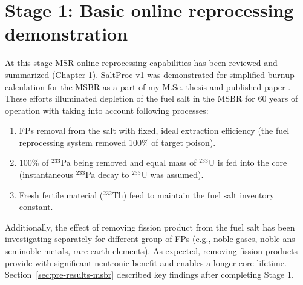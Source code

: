 \section{Stage 1: Basic online reprocessing demonstration}
At this stage \gls{MSR} online reprocessing capabilities has been reviewed and 
summarized (Chapter 1). SaltProc v1 was demonstrated for simplified burnup 
calculation for the \gls{MSBR} as a part of my M.Sc. thesis 
\cite{rykhlevskii_advanced_2018} and published paper 
\cite{rykhlevskii_modeling_2019}. These efforts illuminated depletion of the 
fuel salt in the \gls{MSBR} for 60 years of operation with taking into account 
following processes:
\begin{enumerate}
	\item \glspl{FP} removal from the salt with fixed, ideal extraction 
	efficiency (the fuel reprocessing system removed 100\% of target poison).
	\item 100\% of $^{233}$Pa being removed and equal mass of $^{233}$U is fed 
	into the core (instantaneous $^{233}$Pa decay to $^{233}$U was assumed).
	\item Fresh fertile material ($^{232}$Th) feed to maintain the fuel salt 
	inventory constant.
\end{enumerate}
Additionally, the effect of removing fission product from the fuel salt has 
been investigating separately for different group of \glspl{FP} (e.g., noble 
gases, noble ans seminoble metals, rare earth elements). As expected, removing 
fission products provide with significant neutronic benefit and enables a 
longer core lifetime. Section~\ref{sec:pre-results-msbr} described key 
findings after completing Stage 1.

